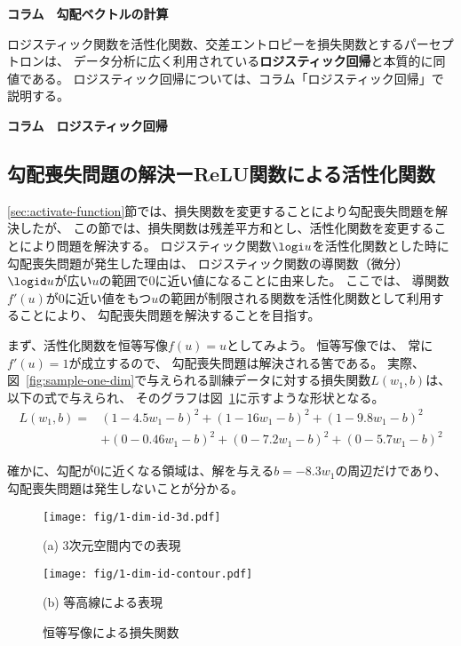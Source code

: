 \begin{itembox}{\bf コラム　勾配ベクトルの計算}
  
\end{itembox}

ロジスティック関数を活性化関数、交差エントロピーを損失関数とするパーセプトロンは、
データ分析に広く利用されている\textbf{ロジスティック回帰}と本質的に同値である。
ロジスティック回帰については、コラム「ロジスティック回帰」で説明する。

\begin{itembox}{\bf コラム　ロジスティック回帰}
  
\end{itembox}

\subsection{勾配喪失問題の解決ーReLU関数による活性化関数}
\label{sec:relu}

\ref{sec:activate-function}節では、損失関数を変更することにより勾配喪失問題を解決したが、
この節では、損失関数は残差平方和とし、活性化関数を変更することにより問題を解決する。
ロジスティック関数$\logi u$を活性化関数とした時に勾配喪失問題が発生した理由は、
ロジスティック関数の導関数（微分）$\logid u$が広い$u$の範囲で0に近い値になることに由来した。
ここでは、
導関数$f'(u)$が0に近い値をもつ$u$の範囲が制限される関数を活性化関数として利用することにより、
勾配喪失問題を解決することを目指す。

まず、活性化関数を恒等写像$f(u) = u$としてみよう。
恒等写像では、
常に$f'(u) = 1$が成立するので、
勾配喪失問題は解決される筈である。
実際、
図~\ref{fig:sample-one-dim}で与えられる訓練データに対する損失関数$L(w_1, b)$は、
以下の式で与えられ、
そのグラフは図~\ref{fig:identity-weight-bias}に示すような形状となる。
\begin{align*}
  L(w_1, b) = 
  &
    (1 - 4.5 w_1 - b)^2 + (1 - 16  w_1 - b)^2 + (1 - 9.8  w_1 - b)^2
  \\&
    + (0 - 0.46  w_1 - b)^2 + (0 - 7.2 w_1 - b)^2 + (0 - 5.7 w_1 - b)^2
\end{align*}

確かに、勾配が0に近くなる領域は、解を与える$b = -8.3w_1$の周辺だけであり、
勾配喪失問題は発生しないことが分かる。

\begin{figure}
  \centering
    \texttt{[image: fig/1-dim-id-3d.pdf]}

    (a) 3次元空間内での表現
    \vspace{5mm}

    \texttt{[image: fig/1-dim-id-contour.pdf]}
    
    (b) 等高線による表現

  \caption{恒等写像による損失関数}
\label{fig:identity-weight-bias}
\end{figure}

